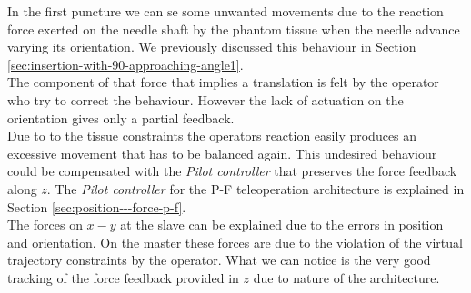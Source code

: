 In the first puncture we can se some unwanted movements due to the reaction force exerted on the needle shaft by the phantom tissue when the needle advance varying its orientation.
We previously discussed this behaviour in Section \ref{sec:insertion-with-90-approaching-angle1}.\\
The component of that force that implies a translation is felt by the operator who try to correct the behaviour. However the lack of actuation on the orientation gives only a partial feedback.\\
Due to to the tissue constraints the operators reaction easily produces an excessive movement that has to be balanced again. This undesired behaviour could be compensated with the \textit{Pilot controller} that preserves the force feedback along $z$. The \textit{Pilot controller} for the P-F teleoperation architecture is explained in Section \ref{sec:position---force-p-f}.\\
The forces on $x-y$ at the slave can be explained due to the errors in position and orientation. On the master these forces are due to the violation of the virtual trajectory constraints by the operator.
What we can notice is the very good tracking of the force feedback provided in $z$ due to nature of the architecture.
